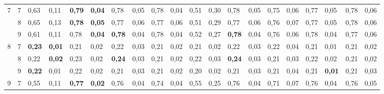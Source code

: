 \documentclass[conference]{IEEEtran}
\begin{document}
\begin{table}[]
\begin{tabular}{|cl|ll|ll|ll|ll|ll|ll|ll|ll|ll|}
		\multicolumn{1}{|c|}{\multirow{3}{*}{7}} & 7 & \multicolumn{1}{l|}{0,63} & 0,11 & \multicolumn{1}{l|}{\textbf{0,79}} & \textbf{0,04} & \multicolumn{1}{l|}{0,78} & 0,05 & \multicolumn{1}{l|}{0,78} & 0,04 & \multicolumn{1}{l|}{0,51} & 0,30 & \multicolumn{1}{l|}{0,78} & 0,05 & \multicolumn{1}{l|}{0,75} & 0,06 & \multicolumn{1}{l|}{0,77} & 0,05 & \multicolumn{1}{l|}{0,78} & 0,06 \\ \cline{2-20} 
		\multicolumn{1}{|c|}{} & 8 & \multicolumn{1}{l|}{0,65} & 0,13 & \multicolumn{1}{l|}{\textbf{0,78}} & \textbf{0,05} & \multicolumn{1}{l|}{0,77} & 0,06 & \multicolumn{1}{l|}{0,77} & 0,06 & \multicolumn{1}{l|}{0,51} & 0,29 & \multicolumn{1}{l|}{0,77} & 0,06 & \multicolumn{1}{l|}{0,76} & 0,07 & \multicolumn{1}{l|}{0,77} & 0,05 & \multicolumn{1}{l|}{0,78} & 0,06 \\ \cline{2-20} 
		\multicolumn{1}{|c|}{} & 9 & \multicolumn{1}{l|}{0,61} & 0,11 & \multicolumn{1}{l|}{0,78} & \textbf{0,04} & \multicolumn{1}{l|}{\textbf{0,78}} & 0,04 & \multicolumn{1}{l|}{0,78} & 0,04 & \multicolumn{1}{l|}{0,52} & 0,27 & \multicolumn{1}{l|}{\textbf{0,78}} & 0,04 & \multicolumn{1}{l|}{0,76} & 0,06 & \multicolumn{1}{l|}{0,78} & 0,04 & \multicolumn{1}{l|}{0,77} & 0,06 \\ \hline
		\multicolumn{1}{|c|}{\multirow{3}{*}{8}} & 7 & \multicolumn{1}{l|}{\textbf{0,23}} & \textbf{0,01} & \multicolumn{1}{l|}{0,21} & 0,02 & \multicolumn{1}{l|}{0,22} & 0,03 & \multicolumn{1}{l|}{0,21} & 0,02 & \multicolumn{1}{l|}{0,21} & 0,02 & \multicolumn{1}{l|}{0,22} & 0,03 & \multicolumn{1}{l|}{0,22} & 0,04 & \multicolumn{1}{l|}{0,21} & 0,01 & \multicolumn{1}{l|}{0,21} & 0,02 \\ \cline{2-20} 
		\multicolumn{1}{|c|}{} & 8 & \multicolumn{1}{l|}{0,22} & \textbf{0,02} & \multicolumn{1}{l|}{0,23} & 0,02 & \multicolumn{1}{l|}{\textbf{0,24}} & 0,03 & \multicolumn{1}{l|}{0,21} & 0,02 & \multicolumn{1}{l|}{0,22} & 0,03 & \multicolumn{1}{l|}{\textbf{0,24}} & 0,03 & \multicolumn{1}{l|}{0,21} & 0,03 & \multicolumn{1}{l|}{0,22} & 0,02 & \multicolumn{1}{l|}{0,21} & 0,02 \\ \cline{2-20} 
		\multicolumn{1}{|c|}{} & 9 & \multicolumn{1}{l|}{\textbf{0,22}} & 0,01 & \multicolumn{1}{l|}{0,22} & 0,02 & \multicolumn{1}{l|}{0,21} & 0,03 & \multicolumn{1}{l|}{0,21} & 0,02 & \multicolumn{1}{l|}{0,20} & 0,02 & \multicolumn{1}{l|}{0,21} & 0,03 & \multicolumn{1}{l|}{0,21} & 0,04 & \multicolumn{1}{l|}{0,21} & \textbf{0,01} & \multicolumn{1}{l|}{0,21} & 0,03 \\ \hline
		\multicolumn{1}{|c|}{\multirow{3}{*}{9}} & 7 & \multicolumn{1}{l|}{0,55} & 0,11 & \multicolumn{1}{l|}{\textbf{0,77}} & \textbf{0,02} & \multicolumn{1}{l|}{0,76} & 0,04 & \multicolumn{1}{l|}{0,74} & 0,04 & \multicolumn{1}{l|}{0,55} & 0,25 & \multicolumn{1}{l|}{0,76} & 0,04 & \multicolumn{1}{l|}{0,71} & 0,07 & \multicolumn{1}{l|}{0,76} & 0,04 & \multicolumn{1}{l|}{0,76} & 0,05 \\ \cline{2-20} 

\end{tabular}
\end{table}
\end{document}
